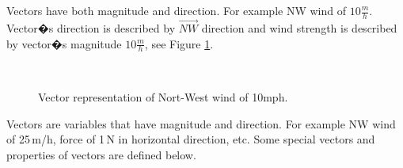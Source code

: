 Vectors have both magnitude and direction. For example NW wind of $10\frac{m}{h}$. Vector�s direction is described by  $\vec{NW}$ direction and wind strength is described by vector�s magnitude $10\frac{m}{h}$, see Figure \ref{wind}. 



\begin{figure}[htbp]
\begin{center}
\strut{} \\
\end{center}
\caption{Vector representation of Nort-West wind of 10mph.}
\label{wind}
\end{figure}


Vectors are variables that have magnitude and direction. For example NW wind of 25\,m/h, force of 1\,N in horizontal direction, etc. Some special vectors and properties of vectors are defined below.



